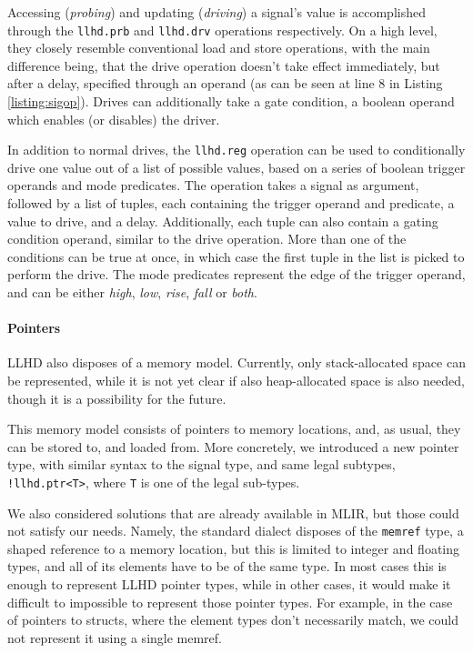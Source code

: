 Accessing (\textit{probing}) and updating (\textit{driving}) a signal's value is accomplished through the \texttt{llhd.prb} and \texttt{llhd.drv} operations respectively. On a high level, they closely resemble conventional load and store operations, with the main difference being, that the drive operation doesn't take effect immediately, but after a delay, specified through an operand (as can be seen at line $8$ in Listing \ref{listing:sigop}). Drives can additionally take a gate condition, a boolean operand which enables (or disables) the driver.

In addition to normal drives, the \texttt{llhd.reg} operation can be used to conditionally drive one value out of a list of possible values, based on a series of boolean trigger operands and mode predicates. The operation takes a signal as argument, followed by a list of tuples, each containing the trigger operand and predicate, a value to drive, and a delay. Additionally, each tuple can also contain a gating condition operand, similar to the drive operation. More than one of the conditions can be true at once, in which case the first tuple in the list is picked to perform the drive. The mode predicates represent the edge of the trigger operand, and can be either \textit{high}, \textit{low}, \textit{rise}, \textit{fall} or \textit{both}.

\paragraph{Pointers}
LLHD also disposes of a memory model. Currently, only stack-allocated space can be represented, while it is not yet clear if also heap-allocated space is also needed, though it is a possibility for the future.

This memory model consists of pointers to memory locations, and, as usual, they can be stored to, and loaded from. More concretely, we introduced a new pointer type, with similar syntax to the signal type, and same legal subtypes, \ie \texttt{!llhd.ptr<T>}, where \texttt{T} is one of the legal sub-types.

We also considered solutions that are already available in MLIR, but those could not satisfy our needs. Namely, the standard dialect disposes of the \texttt{memref} type, a shaped reference to a memory location, but this is limited to integer and floating types, and all of its elements have to be of the same type. In most cases this is enough to represent LLHD pointer types, while in other cases, it would make it difficult to impossible to represent those pointer types. For example, in the case of pointers to structs, where the element types don't necessarily match, we could not represent it using a single memref.

